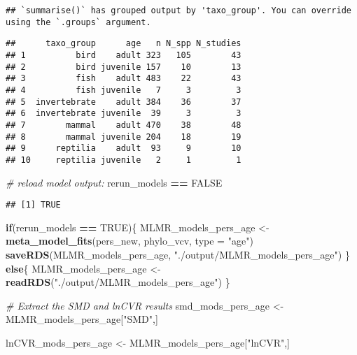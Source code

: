 \documentclass[]{article}
\newenvironment{Shaded}{\begin{snugshade}}{\end{snugshade}}
\newcommand{\KeywordTok}[1]{\textcolor[rgb]{0.13,0.29,0.53}{\textbf{#1}}}
\newcommand{\DataTypeTok}[1]{\textcolor[rgb]{0.13,0.29,0.53}{#1}}
\newcommand{\StringTok}[1]{\textcolor[rgb]{0.31,0.60,0.02}{#1}}
\newcommand{\CommentTok}[1]{\textcolor[rgb]{0.56,0.35,0.01}{\textit{#1}}}
\newcommand{\OtherTok}[1]{\textcolor[rgb]{0.56,0.35,0.01}{#1}}
\newcommand{\ControlFlowTok}[1]{\textcolor[rgb]{0.13,0.29,0.53}{\textbf{#1}}}
\newcommand{\OperatorTok}[1]{\textcolor[rgb]{0.81,0.36,0.00}{\textbf{#1}}}
\newcommand{\NormalTok}[1]{#1}
\begin{document}
\begin{verbatim}
## `summarise()` has grouped output by 'taxo_group'. You can override using the `.groups` argument.
\end{verbatim}

\begin{verbatim}
##      taxo_group      age   n N_spp N_studies
## 1          bird    adult 323   105        43
## 2          bird juvenile 157    10        13
## 3          fish    adult 483    22        43
## 4          fish juvenile   7     3         3
## 5  invertebrate    adult 384    36        37
## 6  invertebrate juvenile  39     3         3
## 7        mammal    adult 470    38        48
## 8        mammal juvenile 204    18        19
## 9      reptilia    adult  93     9        10
## 10     reptilia juvenile   2     1         1
\end{verbatim}

\begin{Shaded}
\begin{Highlighting}[]
\CommentTok{# reload model output:}
\NormalTok{rerun_models }\OperatorTok{==}\StringTok{ }\OtherTok{FALSE}
\end{Highlighting}
\end{Shaded}

\begin{verbatim}
## [1] TRUE
\end{verbatim}

\begin{Shaded}
\begin{Highlighting}[]
  \ControlFlowTok{if}\NormalTok{(rerun_models }\OperatorTok{==}\StringTok{ }\OtherTok{TRUE}\NormalTok{)\{}
\NormalTok{      MLMR_models_pers_age <-}\StringTok{ }\KeywordTok{meta_model_fits}\NormalTok{(pers_new, phylo_vcv, }\DataTypeTok{type =} \StringTok{"age"}\NormalTok{)}
      \KeywordTok{saveRDS}\NormalTok{(MLMR_models_pers_age, }\StringTok{"./output/MLMR_models_pers_age"}\NormalTok{)}
\NormalTok{    \} }\ControlFlowTok{else}\NormalTok{\{}
\NormalTok{     MLMR_models_pers_age <-}\StringTok{ }\KeywordTok{readRDS}\NormalTok{(}\StringTok{"./output/MLMR_models_pers_age"}\NormalTok{)}
\NormalTok{    \}}


\CommentTok{# Extract the SMD and lnCVR results}
\NormalTok{  smd_mods_pers_age <-}\StringTok{ }\NormalTok{MLMR_models_pers_age[}\StringTok{"SMD"}\NormalTok{,]}
    
\NormalTok{  lnCVR_mods_pers_age <-}\StringTok{ }\NormalTok{MLMR_models_pers_age[}\StringTok{"lnCVR"}\NormalTok{,]}
\end{Highlighting}
\end{Shaded}
\end{document}
